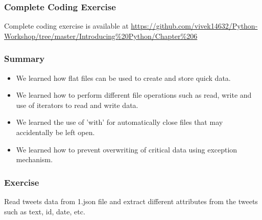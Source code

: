\documentclass{beamer}
\begin{document}
\begin{frame}
\frametitle{Complete Coding Exercise}
Complete coding exercise is available at \url{https://github.com/vivek14632/Python-Workshop/tree/master/Introducing\%20Python/Chapter\%206}
\end{frame}

\begin{frame}
\frametitle{Summary}
\begin{itemize}
\item We learned how flat files can be used to create and store quick data.
\item We learned how to perform different file operations such as read, write and use of iterators to read and write data.
\item We learned the use of 'with' for automatically close files that may accidentally be left open.
\item We learned how to prevent overwriting of critical data using exception mechanism.
\end{itemize}
\end{frame}

\begin{frame}

\frametitle{Exercise}

Read tweets data from 1.json file and extract different attributes from the tweets such as text, id, date, etc.

\end{frame}
\end{document}
